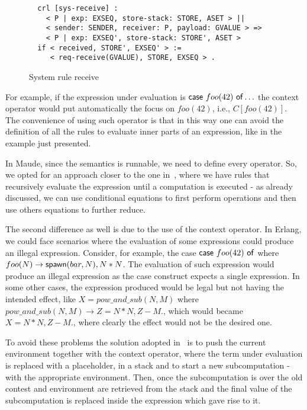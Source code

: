 \documentclass{article}[12pt,a4paper]
\theoremstyle{definition}
\begin{document}
\begin{figure}[t]
  \centering
\begin{verbatim}
  crl [sys-receive] :
    < P | exp: EXSEQ, store-stack: STORE, ASET > ||
    < sender: SENDER, receiver: P, payload: GVALUE > =>
    < P | exp: EXSEQ', store-stack: STORE', ASET >
  if < received, STORE', EXSEQ' > :=
     < req-receive(GVALUE), STORE, EXSEQ > .
\end{verbatim}
  \caption{System rule receive}
  \label{fig:rule-rec}
\end{figure}




 For example, if the expression under evaluation is
$\mathsf{case}~foo(42)~\mathsf{of}\ldots$ the context operator would put automatically
the focus on $foo(42)$, i.e., $C[foo(42)]$. The convenience of using such
operator is that in this way one can avoid the definition of all the rules to
evaluate inner parts of an expression, like in the example just presented.

In Maude, since the semantics is
runnable, we need to define every operator. So, we opted for an approach closer
to the one in~\cite{LaneseNPV18}, where we have rules that recursively evaluate
the expression until a computation is executed - as already discussed, we can use
conditional equations to first perform operations and then use others equations
to further reduce.

The second difference as well is due to the use of the context operator. In
Erlang, we
could face scenarios where the evaluation of some expressions could
produce an illegal expression. Consider, for example, the case
$\mathsf{case}~foo(42)~\mathsf{of}$ where $foo(N) \rightarrow \mathsf{spawn}(bar,N), N*N$.
The evaluation of such expression would produce an illegal expression as the case construct expects a single expression. In
some other cases, the expression produced would be legal but not having the
intended effect, like $X=pow\_and\_sub(N,M)$ where $pow\_and\_sub(N,M)
\rightarrow Z = N*N, Z-M.$, which would became $X=N*N, Z-M.$, where clearly the
effect would not be the desired one.

To avoid these problems the solution adopted
in~\cite{Gonzalez-AbrilV21} is to push the current environment together with the
context operator, where the term under evaluation is replaced with a
placeholder, in a stack and to start a new subcomputation - with the appropriate
environment. Then, once the
subcomputation is over the old contest and environment are retrieved from the
stack and the final value of the subcomputation is replaced inside the expression
which gave rise to it.
\end{document}
